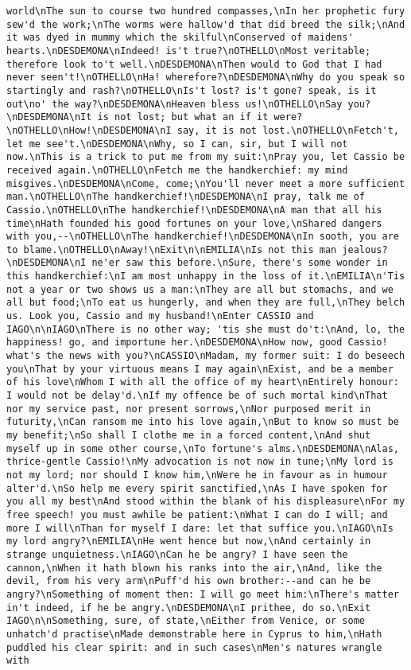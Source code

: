 \begin{verbatim}
world\nThe sun to course two hundred compasses,\nIn her prophetic fury sew'd the work;\nThe worms were hallow'd that did breed the silk;\nAnd it was dyed in mummy which the skilful\nConserved of maidens' hearts.\nDESDEMONA\nIndeed! is't true?\nOTHELLO\nMost veritable; therefore look to't well.\nDESDEMONA\nThen would to God that I had never seen't!\nOTHELLO\nHa! wherefore?\nDESDEMONA\nWhy do you speak so startingly and rash?\nOTHELLO\nIs't lost? is't gone? speak, is it out\no' the way?\nDESDEMONA\nHeaven bless us!\nOTHELLO\nSay you?\nDESDEMONA\nIt is not lost; but what an if it were?\nOTHELLO\nHow!\nDESDEMONA\nI say, it is not lost.\nOTHELLO\nFetch't, let me see't.\nDESDEMONA\nWhy, so I can, sir, but I will not now.\nThis is a trick to put me from my suit:\nPray you, let Cassio be received again.\nOTHELLO\nFetch me the handkerchief: my mind misgives.\nDESDEMONA\nCome, come;\nYou'll never meet a more sufficient man.\nOTHELLO\nThe handkerchief!\nDESDEMONA\nI pray, talk me of Cassio.\nOTHELLO\nThe handkerchief!\nDESDEMONA\nA man that all his time\nHath founded his good fortunes on your love,\nShared dangers with you,--\nOTHELLO\nThe handkerchief!\nDESDEMONA\nIn sooth, you are to blame.\nOTHELLO\nAway!\nExit\n\nEMILIA\nIs not this man jealous?\nDESDEMONA\nI ne'er saw this before.\nSure, there's some wonder in this handkerchief:\nI am most unhappy in the loss of it.\nEMILIA\n'Tis not a year or two shows us a man:\nThey are all but stomachs, and we all but food;\nTo eat us hungerly, and when they are full,\nThey belch us. Look you, Cassio and my husband!\nEnter CASSIO and IAGO\n\nIAGO\nThere is no other way; 'tis she must do't:\nAnd, lo, the happiness! go, and importune her.\nDESDEMONA\nHow now, good Cassio! what's the news with you?\nCASSIO\nMadam, my former suit: I do beseech you\nThat by your virtuous means I may again\nExist, and be a member of his love\nWhom I with all the office of my heart\nEntirely honour: I would not be delay'd.\nIf my offence be of such mortal kind\nThat nor my service past, nor present sorrows,\nNor purposed merit in futurity,\nCan ransom me into his love again,\nBut to know so must be my benefit;\nSo shall I clothe me in a forced content,\nAnd shut myself up in some other course,\nTo fortune's alms.\nDESDEMONA\nAlas, thrice-gentle Cassio!\nMy advocation is not now in tune;\nMy lord is not my lord; nor should I know him,\nWere he in favour as in humour alter'd.\nSo help me every spirit sanctified,\nAs I have spoken for you all my best\nAnd stood within the blank of his displeasure\nFor my free speech! you must awhile be patient:\nWhat I can do I will; and more I will\nThan for myself I dare: let that suffice you.\nIAGO\nIs my lord angry?\nEMILIA\nHe went hence but now,\nAnd certainly in strange unquietness.\nIAGO\nCan he be angry? I have seen the cannon,\nWhen it hath blown his ranks into the air,\nAnd, like the devil, from his very arm\nPuff'd his own brother:--and can he be angry?\nSomething of moment then: I will go meet him:\nThere's matter in't indeed, if he be angry.\nDESDEMONA\nI prithee, do so.\nExit IAGO\n\nSomething, sure, of state,\nEither from Venice, or some unhatch'd practise\nMade demonstrable here in Cyprus to him,\nHath puddled his clear spirit: and in such cases\nMen's natures wrangle with 
\end{verbatim}
